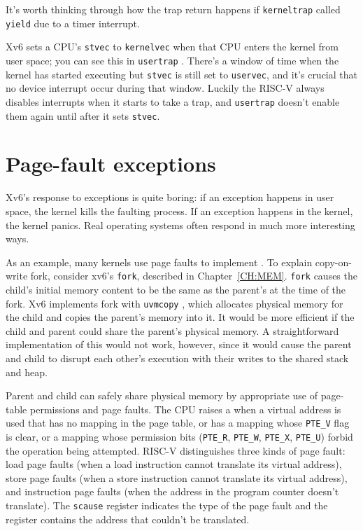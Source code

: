 It's worth thinking through how the trap return happens if
{\tt kerneltrap} called {\tt yield} due to a timer interrupt.

Xv6 sets a CPU's {\tt stvec} to {\tt kernelvec} when that CPU
enters the kernel from user space; you can see this in {\tt usertrap}
.
There's a window of time when the kernel has started executing
but {\tt stvec} is still set to {\tt uservec}, and it's crucial that 
no device interrupt occur during that window.
Luckily the RISC-V always disables interrupts when it starts
to take a trap, and {\tt usertrap} doesn't enable them again until
after it sets {\tt stvec}.

\section{Page-fault exceptions}
\label{sec:pagefaults}

Xv6's response to exceptions is quite boring: if an exception happens
in user space, the kernel kills the faulting process.  If an
exception happens in the kernel, the kernel panics.  Real operating systems
often respond in much more interesting ways.

As an example,
many kernels use page faults to implement
.
To explain copy-on-write fork, consider xv6's \lstinline{fork},
described in Chapter~\ref{CH:MEM}.
\lstinline{fork} causes the child's initial
memory content to be the same as the parent's at the time of the fork.
Xv6 implements fork with
\lstinline{uvmcopy}
,
which allocates physical memory for
the child and copies the parent's memory into it.
It would be more efficient if the child and parent could share 
the parent's physical memory.
A straightforward implementation of this would not work, however,
since it would cause the parent and child to disrupt each other's
execution with their writes to the shared stack and heap.

Parent and child can safely share physical memory by
appropriate use of page-table permissions and page faults.
The CPU raises a
when a virtual address is used that has no mapping
in the page table, or has a mapping whose \lstinline{PTE_V}
flag is clear, or a mapping whose permission bits
(\lstinline{PTE_R},
\lstinline{PTE_W},
\lstinline{PTE_X},
\lstinline{PTE_U})
forbid the operation being attempted.
RISC-V distinguishes three
kinds of page fault: load page faults (when a load instruction cannot
translate its virtual address), store page faults (when a store
instruction cannot translate its virtual address), and instruction
page faults (when the address in the program counter doesn't translate).  The
\lstinline{scause} register indicates the type of the
page fault and the  register contains the address
that couldn't be translated.

